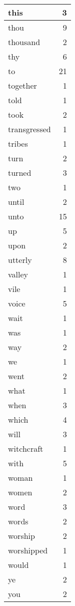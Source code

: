 \begin{center}
\begin{longtable}{l|r}
this & 3 \\ \hline
thou & 9 \\ \hline
thousand & 2 \\ \hline
thy & 6 \\ \hline
to & 21 \\ \hline
together & 1 \\ \hline
told & 1 \\ \hline
took & 2 \\ \hline
transgressed & 1 \\ \hline
tribes & 1 \\ \hline
turn & 2 \\ \hline
turned & 3 \\ \hline
two & 1 \\ \hline
until & 2 \\ \hline
unto & 15 \\ \hline
up & 5 \\ \hline
upon & 2 \\ \hline
utterly & 8 \\ \hline
valley & 1 \\ \hline
vile & 1 \\ \hline
voice & 5 \\ \hline
wait & 1 \\ \hline
was & 1 \\ \hline
way & 2 \\ \hline
we & 1 \\ \hline
went & 2 \\ \hline
what & 1 \\ \hline
when & 3 \\ \hline
which & 4 \\ \hline
will & 3 \\ \hline
witchcraft & 1 \\ \hline
with & 5 \\ \hline
woman & 1 \\ \hline
women & 2 \\ \hline
word & 3 \\ \hline
words & 2 \\ \hline
worship & 2 \\ \hline
worshipped & 1 \\ \hline
would & 1 \\ \hline
ye & 2 \\ \hline
you & 2 \\ \hline
\end{longtable}
\end{center}



